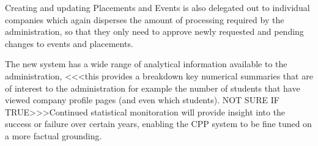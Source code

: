   Creating and updating Placements and Events is also delegated out to individual companies which again disperses the amount of processing required by the administration, so that they only need to approve newly requested and pending changes to events and placements.

  The new system has a wide range of analytical information available to the administration, <<<this provides a breakdown key numerical summaries that are of interest to the administration for example the number of students that have viewed company profile pages (and even which students). NOT SURE IF TRUE>>>Continued statistical monitoration will provide insight into the success or failure over certain years, enabling the CPP system to be fine tuned on a more factual grounding. 